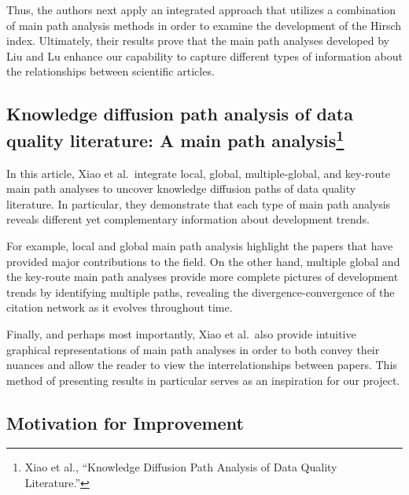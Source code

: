 \documentclass[lettepaper,]{article}
\begin{document}
Thus, the authors next apply an integrated approach that utilizes a
combination of main path analysis methods in order to examine the
development of the Hirsch index. Ultimately, their results prove that
the main path analyses developed by Liu and Lu enhance our capability to
capture different types of information about the relationships between
scientific articles.

\hypertarget{knowledge-diffusion-path-analysis-of-data-quality-literature-a-main-path-analysis-xiaoknowledgediffusionpath2014}{%
\subsection[Knowledge diffusion path analysis of data quality
literature: A main path analysis]{\texorpdfstring{Knowledge diffusion
path analysis of data quality literature: A main path analysis\footnote{Xiao
  et al., ``Knowledge Diffusion Path Analysis of Data Quality
  Literature.''}}{Knowledge diffusion path analysis of data quality literature: A main path analysis}}\label{knowledge-diffusion-path-analysis-of-data-quality-literature-a-main-path-analysis-xiaoknowledgediffusionpath2014}}

In this article, Xiao et al.~integrate local, global, multiple-global,
and key-route main path analyses to uncover knowledge diffusion paths of
data quality literature. In particular, they demonstrate that each type
of main path analysis reveals different yet complementary information
about development trends.

For example, local and global main path analysis highlight the papers
that have provided major contributions to the field. On the other hand,
multiple global and the key-route main path analyses provide more
complete pictures of development trends by identifying multiple paths,
revealing the divergence-convergence of the citation network as it
evolves throughout time.

Finally, and perhaps most importantly, Xiao et al.~also provide
intuitive graphical representations of main path analyses in order to
both convey their nuances and allow the reader to view the
interrelationships between papers. This method of presenting results in
particular serves as an inspiration for our project.

\hypertarget{motivation-for-improvement}{%
\subsection{Motivation for
Improvement}\label{motivation-for-improvement}}
\end{document}

